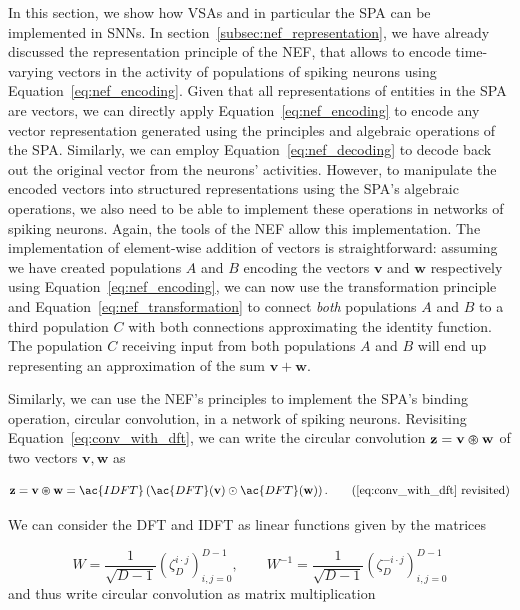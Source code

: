 In this section, we show how \acp{VSA} and in particular the \ac{SPA} can be implemented in \acp{SNN}.
In section~\ref{subsec:nef_representation}, we have already discussed the representation principle of the \ac{NEF}, that allows to encode time-varying vectors in the activity of populations of spiking neurons using Equation~\eqref{eq:nef_encoding}.
Given that all representations of entities in the \ac{SPA} are vectors, we can directly apply Equation~\eqref{eq:nef_encoding} to encode any vector representation generated using the principles and algebraic operations of the \ac{SPA}.
Similarly, we can employ Equation~\eqref{eq:nef_decoding} to decode back out the original vector from the neurons' activities.
However, to manipulate the encoded vectors into structured representations using the \ac{SPA}'s algebraic operations, we also need to be able to implement these operations in networks of spiking neurons.
Again, the tools of the \ac{NEF} allow this implementation.
The implementation of element-wise addition of vectors is straightforward: assuming we have created populations $A$ and $B$ encoding the vectors $ \mathbf{v}$ and $ \mathbf{w}$ respectively using Equation~\eqref{eq:nef_encoding}, we can now use the transformation principle and Equation~\eqref{eq:nef_transformation} to connect \emph{both} populations $A$ and $B$ to a third population $C$ with both connections approximating the identity function.
The population $C$ receiving input from both populations $A$ and $B$ will end up representing an approximation of the sum $ \mathbf{v}+ \mathbf{w}$.

Similarly, we can use the \ac{NEF}'s principles to implement the \ac{SPA}'s binding operation, circular convolution, in a network of spiking neurons.
Revisiting Equation~\eqref{eq:conv_with_dft}, we can write the circular convolution $ \mathbf{z} = \mathbf{v} \varoast \mathbf{w}$ of two vectors $\mathbf{v},\mathbf{w}$ as

\begin{equation}
    \mathbf{z} = \mathbf{v} \varoast \mathbf{w} = \ac{IDFT}\left(\ac{DFT}( \mathbf{v}) \odot \ac{DFT}( \mathbf{w}) \right). \tag{\ref{eq:conv_with_dft} revisited}
\end{equation}

We can consider the \ac{DFT} and \ac{IDFT} as linear functions given by the matrices

\begin{equation}
\label{eq:dft_mat}
W = \frac{1}{ \sqrt{D-1}} \left(\zeta_{D} ^{i\cdot j}\right)_{i,j=0}^{D-1}, \qquad
W^{-1} = \frac{1}{ \sqrt{D-1}} \left(\zeta_{D} ^{-i\cdot j}\right)_{i,j=0}^{D-1}
\end{equation}
and thus write circular convolution as matrix multiplication

